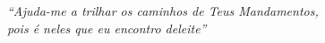 %
%
%
%
%
%
%
%
%
%
%
%
%
%
%
%
%
%
%
%
%
%
%
%
% 
% 
% 
% 
% 
% 
%
%
%
%
%
%
%
%
%
%

\chapter*{}
\thispagestyle{empty}
\begin{flushright}
\begin{vplace}[30]

\emph{``Ajuda-me a trilhar os caminhos de Teus Man­damentos,\\ pois é neles
que eu encontro deleite''}
\end{vplace}
\end{flushright}

